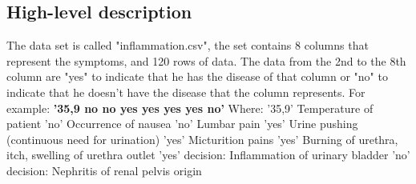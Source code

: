 \documentclass[a4paper,twoside,11pt]{article}
\begin{document}
\subsection{High-level description}
The data set is called "inflammation.csv", the set contains 8 columns that represent the symptoms, and 120 rows of data. The data from the 2nd to the 8th column are "yes" to indicate that he has the disease of that column or "no" to indicate that he doesn't have the disease that the column represents. For example: \newline
\textbf{'35,9 no no yes yes yes yes no'} \newline
Where: \newline
'35,9' Temperature of patient \newline
'no' Occurrence of nausea \newline
'no' Lumbar pain \newline
'yes' Urine pushing (continuous need for urination) \newline
'yes' Micturition pains \newline
'yes' Burning of urethra, itch, swelling of urethra outlet \newline
'yes' decision: Inflammation of urinary bladder \newline
'no' decision: Nephritis of renal pelvis origin  \newline
\end{document}
